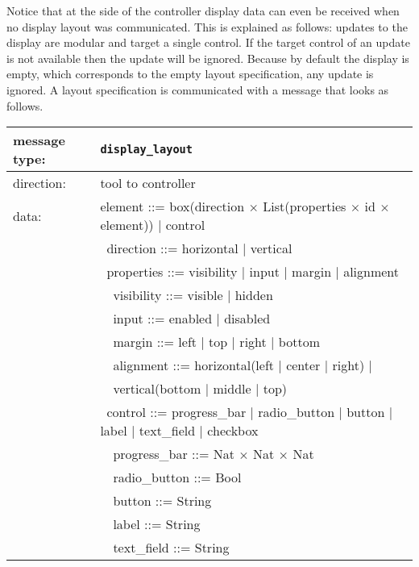 \documentclass{article}
\newcommand{\msg}[1]{\texttt{#1}}
\begin{document}
   \noindent Notice that at the side of the controller display data can even be
   received when no display layout was communicated. This is explained as
   follows: updates to the display are modular and target a single control. If
   the target control of an update is not available then the update will be
   ignored. Because by default the display is empty, which corresponds to the
   empty layout specification, any update is ignored. A layout specification is
   communicated with a message that looks as follows.
   
   \begin{table}[H]
    \begin{center}
     \begin{tabular}{|ll|}
      \hline
       message type:   & \msg{display\_layout} \\
      \hline
       direction:      & tool to controller \\
       data:           & element ::= box(direction $\times$ List(properties $\times$ id $\times$ element)) $|$ control \\
                       & \ direction ::= horizontal $|$ vertical \\
                       & \ properties ::= visibility $|$ input $|$ margin $|$ alignment \\
                       & \ \ visibility ::= visible $|$ hidden \\
                       & \ \ input ::= enabled $|$ disabled \\
                       & \ \ margin ::= left $|$ top $|$ right $|$ bottom \\
                       & \ \ alignment ::= horizontal(left $|$ center $|$ right) $|$ \\
                       & \ \                    vertical(bottom $|$ middle $|$ top) \\
                       & \ control ::= progress\_bar $|$ radio\_button $|$ button $|$ label $|$ text\_field $|$ checkbox \\
                       & \ \ progress\_bar ::= Nat $\times$ Nat $\times$ Nat \\
                       & \ \ radio\_button ::= Bool \\
                       & \ \ button        ::= String \\
                       & \ \ label         ::= String \\
                       & \ \ text\_field   ::= String \\
      \hline
     \end{tabular}
    \end{center}
   \end{table}
\end{document}
